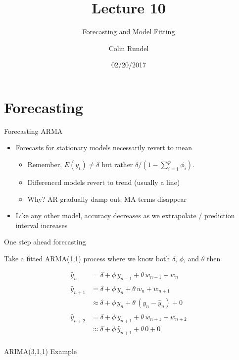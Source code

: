 \documentclass[11pt,ignorenonframetext,]{beamer}
\title{Lecture 10}
\subtitle{Forecasting and Model Fitting}
\author{Colin Rundel}
\date{02/20/2017}
\begin{document}
\frame{\titlepage}

\section{Forecasting}\label{forecasting}

\begin{frame}[t]{Forecasting ARMA}

\begin{itemize}
\item
  Forecasts for stationary models necessarily revert to mean

  \begin{itemize}
  \item
    Remember, \(E(y_t) \ne \delta\) but rather
    \(\delta / (1 - \sum_{i=1}^p \phi_i)\).
  \item
    Differenced models revert to trend (usually a line)
  \item
    Why? AR gradually damp out, MA terms disappear
  \end{itemize}
\item
  Like any other model, accuracy decreases as we extrapolate /
  prediction interval increases
\end{itemize}

\end{frame}

\begin{frame}[t]{One step ahead forecasting}

Take a fitted ARMA(1,1) process where we know both \(\delta\), \(\phi\),
and \(\theta\) then

\[
\begin{aligned}
\hat{y}_n &= \delta + \phi \, y_{n-1} + \theta \, w_{n-1} + w_n \\
\\
\hat{y}_{n+1} &= \delta + \phi \, y_{n} + \theta \, w_{n} + w_{n+1} \\
              &\approx \delta + \phi \, y_{n} + \theta \, (y_n - \hat{y}_n) + 0 \\
\\
\hat{y}_{n+2} &= \delta + \phi \, y_{n+1} + \theta \, w_{n+1} + w_{n+2} \\
              &\approx \delta + \phi \, \hat{y}_{n+1} + \theta \, 0 + 0 \\
\end{aligned}
\]

\end{frame}

\begin{frame}{ARIMA(3,1,1) Example}

\end{frame}
\end{document}
